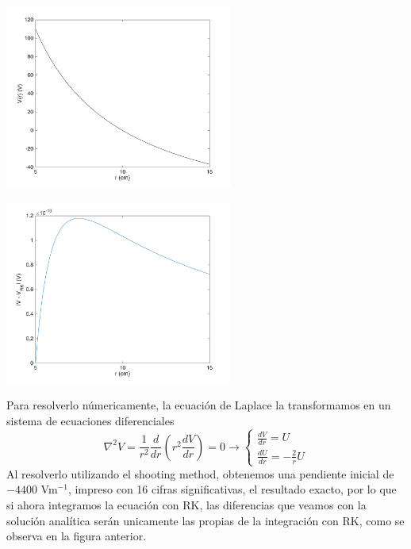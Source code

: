 \documentclass{article}
\begin{document}
\begin{minipage}{8cm}
	\centering
	\includegraphics[width=7.5cm]{untitled1.png}
  \end{minipage}%
  \begin{minipage}{8cm}
	\centering
	\includegraphics[width=7.5cm]{untitled2.png}
  \end{minipage}
Para resolverlo númericamente, la ecuación de Laplace la transformamos en un sistema de ecuaciones diferenciales
\[\nabla^2 V = \frac{1}{r^2} \frac{d}{dr}\left(r^2 \frac{d V}{dr}\right) = 0 \rightarrow \left\{\begin{matrix}
	\frac{d V}{dr} = U \\ \frac{d U}{dr} = -\frac{2}{r} U 
\end{matrix}\right.\]
Al resolverlo utilizando el shooting method, obtenemos una pendiente inicial de $-4400$ Vm$^{-1}$, impreso con 16 cifras significativas, el resultado exacto, por lo que si ahora integramos la ecuación con RK, las diferencias que veamos con la solución analítica serán unicamente las propias de la integración con RK, como se observa en la figura anterior.
\end{document}
